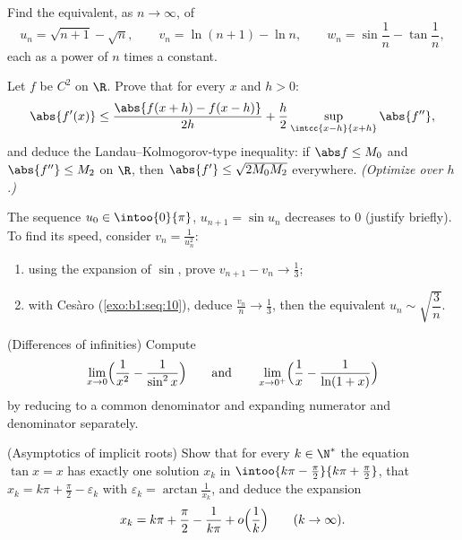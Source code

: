 \begin{exercise}[$\star\star$]\label{exo:b1:taylor:8}
Find the equivalent, as $n \to \infty$, of
\[
u_n = \sqrt{n+1} - \sqrt n, \qquad
v_n = \ln(n+1) - \ln n, \qquad
w_n = \sin\frac{1}{n} - \tan\frac{1}{n},
\]
each as a power of $n$ times a constant.
\end{exercise}

\begin{exercise}[$\star\star\star$]\label{exo:b1:taylor:9}
Let $f$ be $C^2$ on $\R$. Prove that for every $x$ and $h > 0$:
\[
\abs{f'(x)} \leq \frac{\abs{f(x+h) - f(x-h)}}{2h} +
\frac{h}{2}\sup_{\intcc{x-h}{x+h}}\abs{f''} ,
\]
and deduce the Landau--Kolmogorov-type inequality: if $\abs f \leq
M_0$ and $\abs{f''} \leq M_2$ on $\R$, then $\abs{f'} \leq
\sqrt{2 M_0 M_2}$ everywhere. \emph{(Optimize over $h$.)}
\end{exercise}

\begin{exercise}[$\star\star\star$]\label{exo:b1:taylor:10}
The sequence $u_0 \in \intoo{0}{\pi}$, $u_{n+1} = \sin u_n$
decreases to $0$ (justify briefly). To find its speed, consider $v_n
= \frac{1}{u_n^2}$:
\begin{enumerate}
  \item using the expansion of $\sin$, prove $v_{n+1} - v_n \to
        \frac13$;
  \item with Ces\`aro (\cref{exo:b1:seq:10}), deduce $\frac{v_n}{n}
        \to \frac13$, then the equivalent $u_n \sim
        \sqrt{\dfrac{3}{n}}$.
\end{enumerate}
\end{exercise}

\begin{exercise}[$\star\star$]\label{exo:b1:taylor:11}
(Differences of infinities) Compute
\[
\lim_{x \to 0} \Bigl(\frac{1}{x^2} - \frac{1}{\sin^2 x}\Bigr)
\qquad\text{and}\qquad
\lim_{x \to 0^+} \Bigl(\frac 1x - \frac{1}{\ln(1 + x)}\Bigr)
\]
by reducing to a common denominator and expanding numerator and
denominator separately.
\end{exercise}

\begin{exercise}[$\star\star\star$]\label{exo:b1:taylor:12}
(Asymptotics of implicit roots) Show that for every $k \in
\N^*$ the equation $\tan x = x$ has exactly one solution $x_k$
in $\intoo{k\pi - \frac\pi2}{k\pi + \frac\pi2}$, that $x_k = k\pi
+ \frac\pi2 - \varepsilon_k$ with $\varepsilon_k =
\arctan\frac{1}{x_k}$, and deduce the expansion
\[
x_k = k\pi + \frac\pi2 - \frac{1}{k\pi} + o\Bigl(\frac
1k\Bigr) \qquad (k \to \infty).
\]
\end{exercise}

